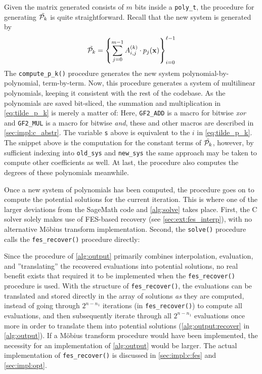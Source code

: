 Given the matrix generated consists of $m$ bits inside a \texttt{poly\_t}, the procedure for generating $\Tilde{\mathcal{P}_k}$ is quite straightforward. Recall that the new system is generated by
\begin{equation} \label{eq:tilde_p_k}
    \Tilde{\mathcal{P}_k} = \left\{\sum_{j = 0}^{m - 1} A^{(k)}_{i,j} \cdot p_j(\mathbf{x})\right\}_{i=0}^{\ell - 1}
\end{equation}
The \texttt{compute\_p\_k()} procedure generates the new system polynomial-by-polynomial, term-by-term. Now, this procedure generates a system of multilinear polynomials, keeping it consistent with the rest of the codebase. As the polynomials are saved bit-sliced, the summation and multiplication in \cref{eq:tilde_p_k} is merely a matter of:
Here, \texttt{GF2\_ADD} is a macro for bitwise \textit{xor} and \texttt{GF2\_MUL} is a macro for bitwise \textit{and}, these and other macros are described in \cref{sec:impl:c_abstr}. The variable \texttt{s} above is equivalent to the $i$ in \cref{eq:tilde_p_k}. The snippet above is the computation for the constant terms of $\Tilde{\mathcal{P}_k}$, however, by sufficient indexing into \texttt{old\_sys} and \texttt{new\_sys} the same approach may be taken to compute other coefficients as well. At last, the procedure also computes the degrees of these polynomials meanwhile.

Once a new system of polynomials has been computed, the procedure goes on to compute the potential solutions for the current iteration. This is where one of the larger deviations from the SageMath code and \cref{alg:solve} takes place. First, the C solver solely makes use of FES-based recovery (see \cref{sec:ext:fes_interp}), with no alternative Möbius transform implementation. Second, the \texttt{solve()} procedure calls the \texttt{fes\_recover()} procedure directly:

Since the procedure of \cref{alg:output} primarily combines interpolation, evaluation, and ''translating'' the recovered evaluations into potential solutions, no real benefit exists that required it to be implemented when the \texttt{fes\_recover()} procedure is used. With the structure of \texttt{fes\_recover()}, the evaluations can be translated and stored directly in the array of solutions \textit{as} they are computed, instead of going through $2^{n - n_1}$ iterations (in \texttt{fes\_recover()}) to compute all evaluations, and then subsequently iterate through all $2^{n - n_1}$ evaluations once more in order to translate them into potential solutions (\cref{alg:output:recover} in \cref{alg:output}). If a Möbius transform procedure would have been implemented, the necessity for an implementation of \cref{alg:output} would be larger. The actual implementation of \texttt{fes\_recover()} is discussed in \cref{sec:impl:c:fes} and \cref{sec:impl:opt}.

